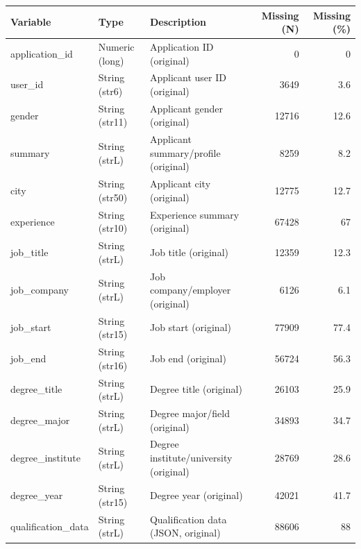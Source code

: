 \begin{threeparttable}


\begin{tabular}{@{}lllrr@{}}


\toprule


\textbf{Variable} & \textbf{Type} & \textbf{Description} & \textbf{Missing (N)} & \textbf{Missing (\%)} \\


\midrule


\midrule
application\_id & Numeric (long) & Application ID (original)&           0&           0\\
user\_id & String (str6) & Applicant user ID (original)&        3649&         3.6\\
gender & String (str11) & Applicant gender (original)&       12716&        12.6\\
summary & String (strL) & Applicant summary/profile (original)&        8259&         8.2\\
city & String (str50) & Applicant city (original)&       12775&        12.7\\
experience & String (str10) & Experience summary (original)&       67428&          67\\
job\_title & String (strL) & Job title (original)&       12359&        12.3\\
job\_company & String (strL) & Job company/employer (original)&        6126&         6.1\\
job\_start & String (str15) & Job start (original)&       77909&        77.4\\
job\_end & String (str16) & Job end (original)&       56724&        56.3\\
degree\_title & String (strL) & Degree title (original)&       26103&        25.9\\
degree\_major & String (strL) & Degree major/field (original)&       34893&        34.7\\
degree\_institute & String (strL) & Degree institute/university (original)&       28769&        28.6\\
degree\_year & String (str15) & Degree year (original)&       42021&        41.7\\
qualification\_data & String (strL) & Qualification data (JSON, original)&       88606&          88\\
\bottomrule


\end{tabular}


\end{threeparttable}
